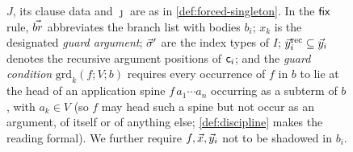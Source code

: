 \begin{figure}[tp]
{  $J$, its clause data and $\jmath$ are as in
  \cref{def:forced-singleton}.  In the $\mathsf{fix}$ rule, $\vec{br}$
  abbreviates the branch list with bodies $b_i$; $x_k$ is the
  designated \emph{guard argument}; $\vec{\sigma}'$ are the index types
  of $I$; $\vec{y}_i^{\mathrm{rec}} \subseteq \vec{y}_i$ denotes the
  recursive argument positions of $\mathsf{c}_i$; and the \emph{guard
  condition} $\mathrm{grd}_k(f; V; b)$ requires every occurrence of $f$
  in $b$ to lie at the head of an application spine $f\,a_1 \cdots
  a_n$ occurring as a subterm of $b$, with $a_k \in V$ (so $f$ may
  head such a spine but not occur as an argument, of itself or of
  anything else; \cref{def:discipline} makes the reading formal).  We
  further require $f, \vec{x}, \vec{y}_i$ not to be shadowed in $b_i$.}
\label{fig:terms2}
\end{figure}

